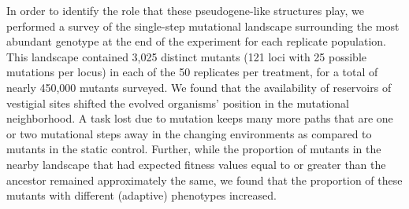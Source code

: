 \documentclass[letterpaper]{article}
\begin{document}
In order to identify the role that these pseudogene-like structures play, we performed a survey of the single-step mutational landscape surrounding the
most abundant genotype at the end of the experiment for
each replicate population. This landscape contained 
3,025 distinct mutants (121 loci with 25 possible mutations per locus) in each of the 50 replicates per treatment, for a total of nearly 450,000 mutants surveyed.
We found that the availability of reservoirs of vestigial sites shifted the evolved organisms'%
position in the mutational neighborhood. %
A task lost due to mutation keeps many more paths that are one or two mutational steps away in the changing environments as compared to mutants in the static control.
Further, while the proportion of mutants in the nearby landscape that had expected fitness values equal to or greater than the ancestor
remained approximately the same, we found that the proportion of these mutants with different (adaptive) phenotypes increased.
\end{document}
